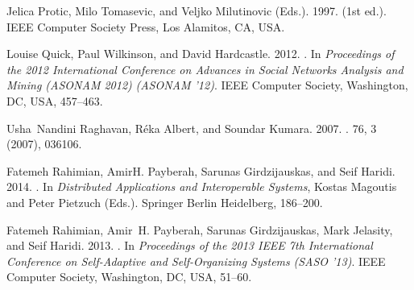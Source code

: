 \documentclass[reprint,twocolumn,showpacs,preprintnumbers,amsmath, aps,pre,amssymb]{revtex4-1}
\begin{document}
\begin{thebibliography}{00}
{
{Jelica Protic}, {Milo Tomasevic}, {and} {Veljko Milutinovic} (Eds.). 1997.
 (1st ed.).
\newblock IEEE Computer Society Press, Los Alamitos, CA, USA.
\newblock
{}


{Louise Quick}, {Paul Wilkinson}, {and} {David Hardcastle}. 2012.
\newblock {}. In {\em Proceedings of the 2012
  International Conference on Advances in Social Networks Analysis and Mining
  (ASONAM 2012)} {\em (ASONAM '12)}. IEEE Computer Society, Washington, DC,
  USA, 457--463.
\newblock
{}


{Usha~Nandini Raghavan}, {R{\'e}ka Albert}, {and} {Soundar Kumara}. 2007.
\newblock {}.
 {76}, 3 (2007), 036106.
\newblock
{}


{Fatemeh Rahimian}, {AmirH. Payberah}, {Sarunas Girdzijauskas}, {and} {Seif
  Haridi}. 2014.
\newblock {}.
\newblock In {\em Distributed Applications and Interoperable Systems}, {Kostas
  Magoutis} {and} {Peter Pietzuch} (Eds.). Springer Berlin Heidelberg,
  186--200.
\newblock
{}


{Fatemeh Rahimian}, {Amir~H. Payberah}, {Sarunas Girdzijauskas}, {Mark
  Jelasity}, {and} {Seif Haridi}. 2013.
\newblock {}. In {\em Proceedings of the 2013 IEEE 7th International
  Conference on Self-Adaptive and Self-Organizing Systems} {\em (SASO '13)}.
  IEEE Computer Society, Washington, DC, USA, 51--60.
\newblock
{}


}
\end{thebibliography}
\end{document}

